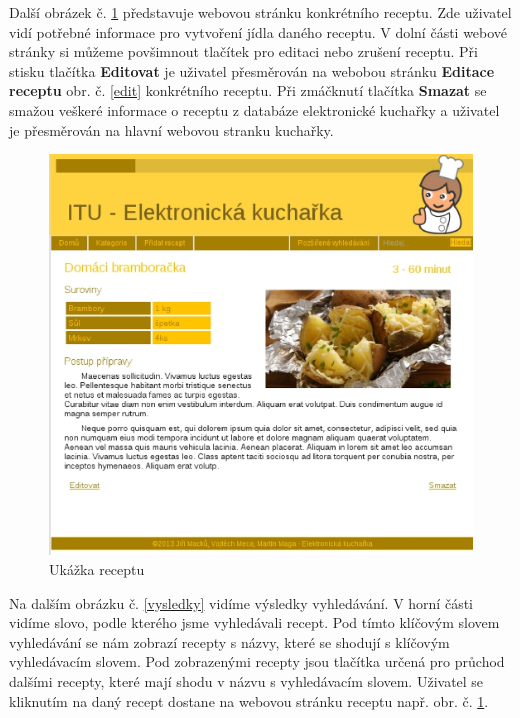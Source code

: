 \documentclass[12pt,a4paper,titlepage,final]{article}
\begin{document}
Další obrázek č. \ref{recept} představuje webovou stránku konkrétního receptu. Zde uživatel vidí potřebné informace pro vytvoření jídla daného receptu. V dolní části webové stránky si můžeme povšimnout tlačítek pro editaci nebo zrušení receptu. Při stisku tlačítka \textbf{Editovat} je uživatel přesměrován na webobou stránku \textbf{Editace receptu} obr. č. \ref{edit} konkrétního receptu. Při zmáčknutí tlačítka \textbf{Smazat} se smažou veškeré informace o receptu z databáze elektronické kuchařky a uživatel je přesměrován na hlavní webovou stranku kuchařky.\newline

\begin{figure}

\begin{center}

\includegraphics[scale=0.7]{img/recept.eps} 
\caption{Ukážka receptu}
\label{recept}


\end{center}

\end{figure}

Na dalším obrázku č. \ref{vysledky} vidíme výsledky vyhledávání. V horní části vidíme slovo, podle kterého jsme vyhledávali recept. Pod tímto klíčovým slovem vyhledávání se nám zobrazí recepty s názvy, které se shodují s klíčovým vyhledávacím slovem. Pod zobrazenými recepty jsou tlačítka určená pro průchod dalšími recepty, které mají shodu v názvu s vyhledávacím slovem. Uživatel se kliknutím na daný recept dostane na webovou stránku receptu např. obr. č. \ref{recept}.\newline
\end{document}
